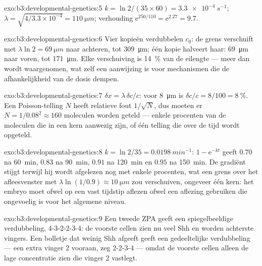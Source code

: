 \begin{solution}{exo:b3:developmental-genetics:5}
$k = \ln 2/(35\times 60) = \qty{3.3e-4}{s^{-1}}$; $\lambda = \sqrt{4/
3.3\times 10^{-4}} = \qty{110}{\micro m}$; verhouding $\mathrm{e}^{250/110}
= \mathrm{e}^{2.27} = 9.7$.
\end{solution}

\begin{solution}{exo:b3:developmental-genetics:6}
Vier kopieën verdubbelen $c_{0}$: de grens verschuift met $\lambda\ln 2 =
\qty{69}{\micro m}$ naar achteren, tot \qty{309}{\micro m}; één kopie
halveert haar: \qty{69}{\micro m} naar voren, tot \qty{171}{\micro m}.
Elke verschuiving is \qty{14}{\%} van de eilengte --- meer dan wordt
waargenomen, wat zelf een aanwijzing is voor mechanismen die de
afhankelijkheid van de dosis dempen.
\end{solution}

\begin{solution}{exo:b3:developmental-genetics:7}
$\delta x = \lambda\,\delta c/c$: voor \qty{8}{\micro m} is $\delta c/c =
8/100 = \qty{8}{\%}$. Een Poisson-telling $N$ heeft relatieve fout
$1/\sqrt{N}$, dus moeten er $N = 1/0.08^{2} \approx 160$ moleculen
worden geteld --- enkele procenten van de moleculen die in een kern
aanwezig zijn, of één telling die over de tijd wordt opgeteld.
\end{solution}

\begin{solution}{exo:b3:developmental-genetics:8}
$k = \ln 2/35 = \qty{0.0198}{min^{-1}}$: $1 - \mathrm{e}^{-kt}$ geeft
$0.70$ na \qty{60}{min}, $0.83$ na \qty{90}{min}, $0.91$ na
\qty{120}{min} en $0.95$ na \qty{150}{min}. De gradiënt stijgt terwijl
hij wordt afgelezen nog met enkele procenten, wat een grens over het
afleesvenster met $\lambda\ln(1/0.9) \approx \qty{10}{\micro m}$ zou
verschuiven, ongeveer één kern: het embryo moet ofwel op een vast
tijdstip aflezen ofwel een aflezing gebruiken die ongevoelig is voor het
algemene niveau.
\end{solution}

\begin{solution}{exo:b3:developmental-genetics:9}
Een tweede ZPA geeft een spiegelbeeldige verdubbeling, 4-3-2-2-3-4: de
voorste cellen zien nu veel Shh en worden achterste vingers. Een
bolletje dat weinig Shh afgeeft geeft een gedeeltelijke verdubbeling
--- een extra vinger 2 vooraan, zeg 2-2-3-4 --- omdat de voorste cellen
alleen de lage concentratie zien die vinger 2 vastlegt.
\end{solution}

